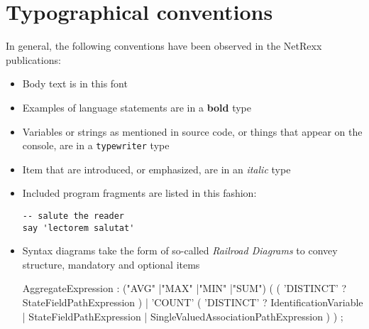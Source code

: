 \chapter{Typographical conventions}
In general, the following conventions have  been observed in the NetRexx publications:
\begin{itemize}
\item Body text is in this font
\item Examples of language statements are in a \textbf{bold} type
\item Variables or strings as mentioned in source code, or things that appear on the console, are in a \texttt{typewriter} type
\item Item that are introduced, or emphasized, are in an \emph{italic} type
\item Included program fragments are listed in this fashion:
\begin{lstlisting}
-- salute the reader
say 'lectorem salutat'
\end{lstlisting}
\item Syntax diagrams take the form of so-called \emph{Railroad Diagrams} to convey structure, mandatory and optional items
\begin{rail}
AggregateExpression : ("AVG" |"MAX" |"MIN" |"SUM")
 (
   (
    'DISTINCT' ?  StateFieldPathExpression
   ) | 'COUNT'
   (
    'DISTINCT' ?  IdentificationVariable
                  | StateFieldPathExpression
                  | SingleValuedAssociationPathExpression
   )
 )
   ;
\end{rail}
\end{itemize}